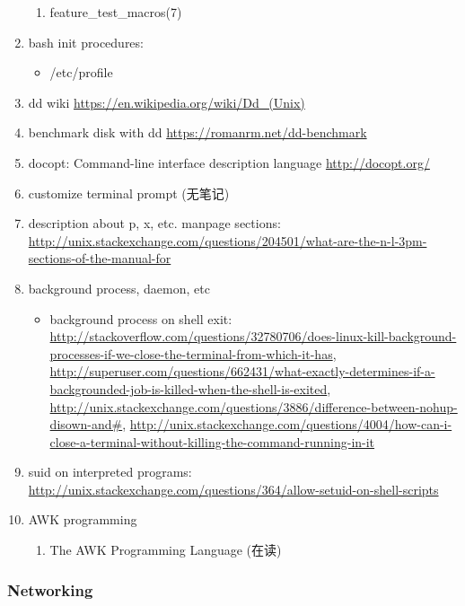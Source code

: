 \documentclass{article}
\begin{document}
\begin{enumerate}
\begin{enumerate}
            \item feature_test_macros(7)
        \end{enumerate}
    \item bash init procedures:
        \begin{itemize}
            \item /etc/profile
        \end{itemize}
    \item dd wiki \url{https://en.wikipedia.org/wiki/Dd_(Unix)}
    \item benchmark disk with dd \url{https://romanrm.net/dd-benchmark}
    \item docopt: Command-line interface description language \url{http://docopt.org/}
    \item customize terminal prompt (无笔记)
    \item description about p, x, etc. manpage sections: \url{http://unix.stackexchange.com/questions/204501/what-are-the-n-l-3pm-sections-of-the-manual-for}
    \item background process, daemon, etc
        \begin{itemize}
            \item background process on shell exit: \url{http://stackoverflow.com/questions/32780706/does-linux-kill-background-processes-if-we-close-the-terminal-from-which-it-has}, \url{http://superuser.com/questions/662431/what-exactly-determines-if-a-backgrounded-job-is-killed-when-the-shell-is-exited}, \url{http://unix.stackexchange.com/questions/3886/difference-between-nohup-disown-and#}, \url{http://unix.stackexchange.com/questions/4004/how-can-i-close-a-terminal-without-killing-the-command-running-in-it}
        \end{itemize}
    \item suid on interpreted programs: \url{http://unix.stackexchange.com/questions/364/allow-setuid-on-shell-scripts}
    \item AWK programming
        \begin{enumerate}
            \item The AWK Programming Language (在读)
        \end{enumerate}
\end{enumerate}
%
\subsubsection{Networking}
%
\begin{itemize}
\end{itemize}
%
\end{document}
